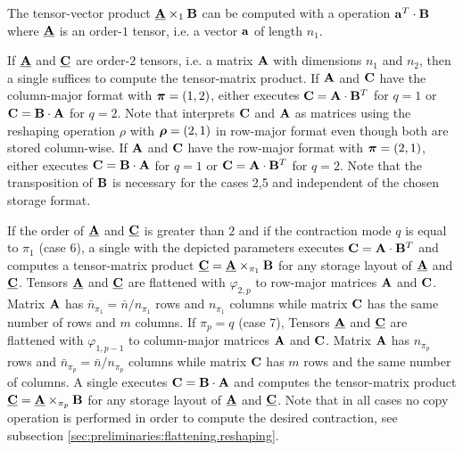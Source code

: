 

The tensor-vector product $\underline{\mathbf{A}} \times_1 \mathbf{B}$ can be computed with a  operation $\mathbf{a}^T \cdot \mathbf{B}$ where $\underline{\mathbf{A}}$ is an order-$1$ tensor, i.e. a vector $\mathbf{a}$ of length $n_1$.

If $\underline{\mathbf{A}}$ and $\underline{\mathbf{C}}$ are order-$2$ tensors, i.e. a matrix $\mathbf{A}$ with dimensions $n_1$ and $n_2$, then a single  suffices to compute the tensor-matrix product. 
If $\mathbf{A}$ and $\mathbf{C}$ have the column-major format with $\boldsymbol{\pi}=(1,2)$,  either executes $\mathbf{C} = \mathbf{A} \cdot \mathbf{B}^T$ for $q =1$ or $\mathbf{C} = \mathbf{B} \cdot \mathbf{A}$ for $q=2$.
Note that  interprets $\mathbf{C}$ and $\mathbf{A}$ as matrices using the reshaping operation $\rho$ with $\boldsymbol{\rho} = (2,1)$ in row-major format even though both are stored column-wise.
If $\mathbf{A}$ and $\mathbf{C}$ have the row-major format with $\boldsymbol{\pi}=(2,1)$,  either executes $\mathbf{C} = \mathbf{B} \cdot \mathbf{A}$ for $q =1$ or $\mathbf{C} = \mathbf{A} \cdot \mathbf{B}^T$ for $q=2$. 
Note that the transposition of $\mathbf{B}$ is necessary for the cases 2,5 and independent of the chosen storage format.

If the order of $\underline{\mathbf{A}}$ and $\underline{\mathbf{C}}$ is greater than $2$ and if the contraction mode $q$ is equal to $\pi_1$ (case 6), a single  with the depicted parameters executes $\mathbf{C} = \mathbf{A} \cdot \mathbf{B}^T$ and computes a tensor-matrix product $\underline{\mathbf{C}} = \underline{\mathbf{A}} \times_{\pi_1} \mathbf{B}$ for any storage layout of $\underline{\mathbf{A}}$ and $\underline{\mathbf{C}}$.
Tensors $\underline{\mathbf{A}}$ and $\underline{\mathbf{C}}$ are flattened with $\varphi_{2,p}$ to row-major matrices $\mathbf{A}$ and $\mathbf{C}$.
Matrix $\mathbf{A}$ has $\bar{n}_{\pi_1} = \bar{n} / n_{\pi_1}$ rows and $n_{\pi_1}$ columns while matrix $\mathbf{C}$ has the same number of rows and $m$ columns.
If $\pi_p=q$ (case 7), Tensors $\underline{\mathbf{A}}$ and $\underline{\mathbf{C}}$ are flattened with $\varphi_{1,p-1}$ to column-major matrices $\mathbf{A}$ and $\mathbf{C}$.
Matrix $\mathbf{A}$ has $n_{\pi_p}$ rows and $\bar{n}_{\pi_p} =  \bar{n} / n_{\pi_p}$ columns while matrix $\mathbf{C}$ has $m$ rows and the same number of columns.
A single  executes $\mathbf{C} = \mathbf{B} \cdot \mathbf{A}$ and computes the tensor-matrix product $\underline{\mathbf{C}} = \underline{\mathbf{A}} \times_{\pi_p} \mathbf{B}$ for any storage layout of $\underline{\mathbf{A}}$ and $\underline{\mathbf{C}}$.
Note that in all cases no copy operation is performed in order to compute the desired contraction, see subsection \ref{sec:preliminaries:flattening.reshaping}.

